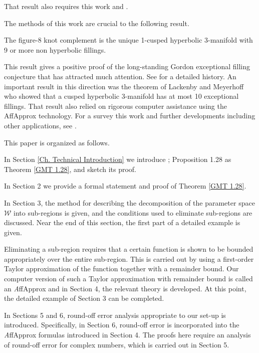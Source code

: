 That result also requires this work and \cite{GMT}.  \vskip 8pt

The methods of this work are crucial to the following result.

\begin{theorem} \cite{GHMTY} The figure-8 knot complement is the unique 1-cusped hyperbolic 3-manifold with 9 or more non hyperbolic fillings.  \end{theorem}
 
This result gives a positive proof of the long-standing Gordon exceptional filling conjecture that has attracted much attention.  See \cite{GHMTY} for a detailed history.  An important result in this direction was the theorem of Lackenby and Meyerhoff \cite{LM} who showed that a cusped hyperbolic 3-manifold has at most 10 exceptional fillings.  That result also relied on rigorous computer assistance using the AffApprox technology.
\vskip 8pt
For a survey this work and further developments including other applications, see \cite{GMTY}.
\vskip 8pt

This paper is organized as follows.

In Section \ref{Ch. Technical Introduction} we introduce
\cite{GMT}; Proposition 1.28 as Theorem \ref{GMT 1.28},
and sketch its proof.

In Section 2 we provide a formal statement and proof of Theorem \ref{GMT 1.28}.

In Section 3,
the method for describing the decomposition
of the parameter space ${\mathcal W}$ into sub-regions is given,
and the conditions used to eliminate sub-regions are discussed.
Near the end of this section, the first part of a detailed example is given.

Eliminating 
a sub-region requires that a certain function is shown to be bounded 
appropriately over the entire sub-region.  This is carried out by using a 
first-order Taylor approximation of the function together with a 
remainder 
bound.
Our computer version of such a Taylor approximation with remainder bound 
is called an {\textit AffApprox} and in Section 4,
the relevant theory is developed.
At this point, the detailed example of Section 3 can be completed.

In Sections 5 and 6, round-off error analysis appropriate to our 
set-up is introduced.  Specifically, in Section 6, round-off error is 
incorporated 
into the {\textit AffApprox} formulas introduced in Section 4.  The proofs here 
require an analysis of round-off error for complex numbers, which is carried 
out in Section 5.

